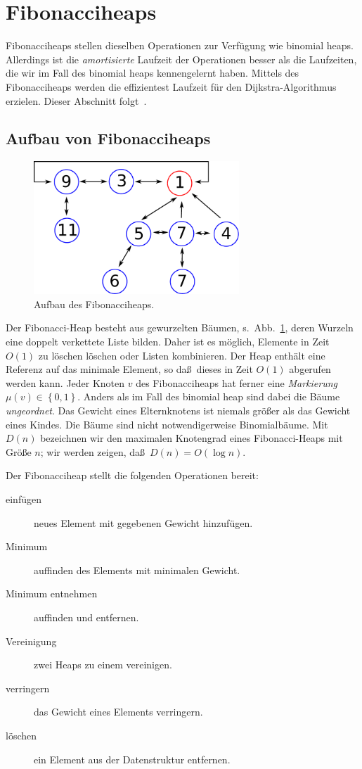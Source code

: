 \documentclass[10pt,reqno]{amsart}
\numberwithin{equation}{section}
\newcommand\alert[1]{\emph{#1}}
\newcommand\cbc[1]{\left\{{#1}\right\}}
\begin{document}
\section{Fibonacciheaps}\label{sec_fibo}

Fibonacciheaps stellen dieselben Operationen zur Verf\"ugung wie binomial heaps.
Allerdings ist die {\em amortisierte} Laufzeit der Operationen besser als die Laufzeiten, die wir im Fall des binomial heaps kennengelernt haben.
Mittels des Fibonacciheaps werden die effizientest Laufzeit f\"ur den Dijkstra-Algorithmus erzielen.
Dieser Abschnitt folgt~\cite{Cormen}.


\subsection{Aufbau von Fibonacciheaps}\label{sec_fibo_intro}

\begin{figure}
	\centering\includegraphics[height=50mm]{images/fibo1.pdf}
	\caption{Aufbau des Fibonacciheaps.}\label{fig_fibo1}
\end{figure}

Der Fibonacci-Heap besteht aus gewurzelten B\"aumen, s.\ Abb.~\ref{fig_fibo1}, deren Wurzeln eine doppelt verkettete Liste bilden.
Daher ist es m\"oglich, Elemente in Zeit $O(1)$ zu l\"oschen l\"oschen oder Listen kombinieren.
			Der Heap enth\"alt eine Referenz auf das minimale Element, so da\ss\ dieses in Zeit $O(1)$ abgerufen werden kann.
			Jeder Knoten $v$ des Fibonacciheaps hat ferner eine \alert{Markierung} $\mu(v)\in\cbc{0,1}$.
Anders als im Fall des binomial heap sind dabei die B\"aume \emph{ungeordnet}.
Das Gewicht eines Elternknotens ist niemals gr\"o\ss er als das Gewicht eines Kindes.
			Die B\"aume sind nicht notwendigerweise Binomialb\"aume.
			Mit $D(n)$ bezeichnen wir den maximalen Knotengrad eines Fibonacci-Heaps mit Gr\"o\ss e $n$; wir werden zeigen, da\ss\ $D(n)=O(\log n)$.

			Der Fibonacciheap stellt die folgenden Operationen bereit:
		\begin{description}
			\item[einf\"ugen] neues Element mit gegebenen Gewicht hinzuf\"ugen.
			\item[Minimum] auffinden des Elements mit minimalen Gewicht.
			\item[Minimum entnehmen] auffinden und entfernen.
			\item[Vereinigung] zwei Heaps zu einem vereinigen.
			\item[verringern] das Gewicht eines Elements verringern.
			\item[l\"oschen] ein Element aus der Datenstruktur entfernen.
		\end{description}
\end{document}

